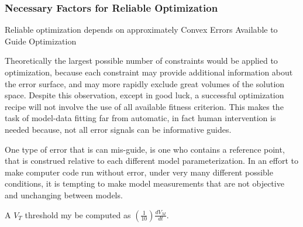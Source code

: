 
\subsubsection{Necessary Factors for Reliable Optimization}
Reliable optimization depends on approximately Convex Errors Available to Guide Optimization

Theoretically the largest possible number of constraints would be applied to optimization, because each constraint may provide additional information about the error surface, and may more rapidly exclude great volumes of the solution space. Despite this observation, except in good luck, a successful optimization recipe will not involve the use of all available fitness criterion. This makes the task of model-data fitting far from automatic, in fact human intervention is needed because, not all error signals can be informative guides. 

    
    One type of error that is can mis-guide, is one who contains a reference point, that is construed relative to each different model parameterization. In an effort to make computer code run without error, under very many different possible conditions, it is tempting to make model measurements that are not objective and unchanging between models. 
    
    A $V_{T}$ threshold my be computed as $(\frac{1}{10})\frac{dV_{M}}{dt}$.
    
